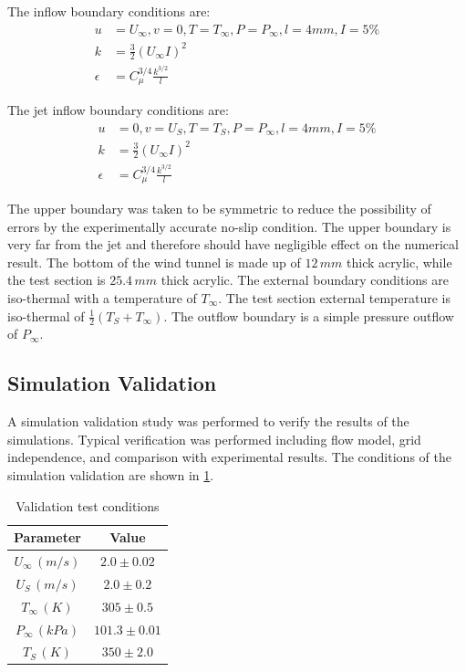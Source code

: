 \documentclass[preprint,12pt]{elsarticle}
\begin{document}
The inflow boundary conditions are:
\begin{subequations}
\label{eq:inflow}
\begin{align}
u&=U_\infty , v=0 , T=T_\infty , P = P_\infty , l=4 mm , I=5\%\\
k&=\frac{3}{2}\left(U_\infty I\right)^2 \\
\epsilon &=C_{\mu}^{3/4} \frac{k^{3/2}}{l}
\end{align}
\end{subequations}

The jet inflow boundary conditions are:
\begin{subequations}
\label{eq:inflowjet}
\begin{align}
u&=0 , v=U_S , T=T_S , P = P_\infty , l=4 mm , I=5\%\\
k&=\frac{3}{2}\left(U_\infty I\right)^2 \\
\epsilon &=C_{\mu}^{3/4} \frac{k^{3/2}}{l}
\end{align}
\end{subequations}

The upper boundary was taken to be symmetric to reduce the possibility of errors by the experimentally accurate no-slip condition.  The upper boundary is very far from the jet and therefore should have negligible effect on the numerical result.  The bottom of the wind tunnel is made up of $12\, mm$ thick acrylic, while the test section is $25.4\,mm$ thick acrylic.  The external boundary conditions are iso-thermal with a temperature of $T_{\infty}$.  The test section external temperature is iso-thermal of $\frac{1}{2}\left(T_S+T_{\infty}\right)$.  The outflow boundary is a simple pressure outflow of $P_{\infty}$.

\subsection{Simulation Validation}
A simulation validation study was performed to verify the results of the simulations.  Typical verification was performed including flow model, grid independence, and comparison with experimental results.  The conditions of the simulation validation are shown in \cref{tab:VTjet}.

\begin{table}[!t!b!p]
\begin{center}
\begin{tabular}{ c c }
\hline
Parameter    & Value \\ \hline
$U_{\infty} \, (m/s)$ & $2.0\pm0.02$ \\
$U_S \, (m/s)$ & $2.0\pm0.2$ \\
$T_{\infty} \, (K) $ & $305\pm0.5$ \\
$P_{\infty} \, (kPa) $ & $101.3\pm0.01$ \\
$T_{S} \, (K) $ & $350\pm2.0$ \\ \hline
\end{tabular}
\caption{Validation test conditions}
\label{tab:VTjet}
\end{center}
\end{table}
\end{document}

